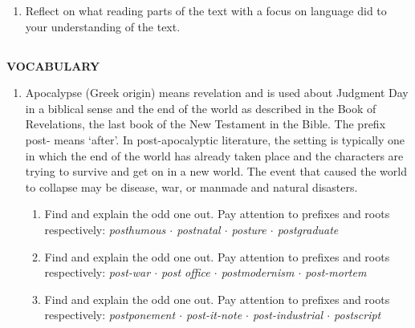 \documentclass[10pt,a4paper,table]{article}
\begin{document}
\begin{enumerate}[label=\arabic*., leftmargin=*]
  \item Reflect on what reading parts of the text with a focus on language did to your understanding of the text.
\end{enumerate}

\subsection{}
\textbf{VOCABULARY}
\begin{enumerate}[label=\arabic*., leftmargin=*]
  \item Apocalypse (Greek origin) means revelation and is used about Judgment Day in a biblical sense and the end of the world as described in the Book of Revelations, the last book of the New Testament in the Bible. The prefix post- means `after'. In post-apocalyptic literature, the setting is typically one in which the end of the world has already taken place and the characters are trying to survive and get on in a new world. The event that caused the world to collapse may be disease, war, or manmade and natural disasters.
  \begin{enumerate}[label=\textbf{\alph*.}, leftmargin=1.5em]
    \item Find and explain the odd one out. Pay attention to prefixes and roots respectively: \textit{posthumous $\cdot$ postnatal $\cdot$ posture $\cdot$ postgraduate}
    \item Find and explain the odd one out. Pay attention to prefixes and roots respectively: \textit{post-war $\cdot$ post office $\cdot$ postmodernism $\cdot$ post-mortem}
    \item Find and explain the odd one out. Pay attention to prefixes and roots respectively: \textit{postponement $\cdot$ post-it-note $\cdot$ post-industrial $\cdot$ postscript}
  \end{enumerate}


\end{enumerate}
\end{document}
